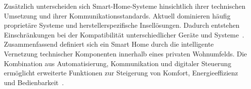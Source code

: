 Zusätzlich unterscheiden sich Smart-Home-Systeme hinsichtlich ihrer technischen Umsetzung und ihrer Kommunikationsstandards.  
Aktuell dominieren häufig proprietäre Systeme und herstellerspezifische Insellösungen.  
Dadurch entstehen Einschränkungen bei der Kompatibilität unterschiedlicher Geräte und Systeme~\cite{Q2}.
Zusammenfassend definiert sich ein Smart Home durch die intelligente Vernetzung technischer Komponenten innerhalb eines privaten Wohnumfelds.  
Die Kombination aus Automatisierung, Kommunikation und digitaler Steuerung ermöglicht erweiterte Funktionen zur Steigerung von Komfort, Energieeffizienz und Bedienbarkeit~\cite{Q1,Q2,Q3}.